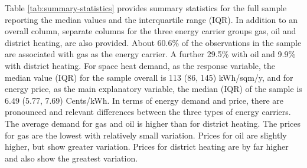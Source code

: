 \documentclass[12pt,twoside]{reedthesis}
\begin{document}
Table \ref{tab:summary-statistics} provides summary statistics for the full sample reporting the median values and the interquartile range (IQR). In addition to an overall column, separate columns for the three energy carrier groups gas, oil and district heating, are also provided. About 60.6\% of the observations in the sample are associated with gas as the energy carrier. A further 29.5\% with oil and 9.9\% with district heating. For space heat demand, as the response variable, the median value (IQR) for the sample overall is 113 (86, 145) kWh/sqm/y, and for energy price, as the main explanatory variable, the median (IQR) of the sample is 6.49 (5.77, 7.69) Cents/kWh. In terms of energy demand and price, there are pronounced and relevant differences between the three types of energy carriers. The average demand for gas and oil is higher than for district heating. The prices for gas are the lowest with relatively small variation. Prices for oil are slightly higher, but show greater variation. Prices for district heating are by far higher and also show the greatest variation.
\end{document}
